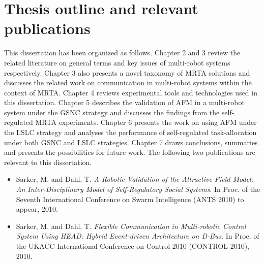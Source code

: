 \section{Thesis outline and relevant publications}
This dissertation has been organized as follows.
Chapter 2 and 3 review the related literature on general terms and key issues of multi-robot systems respectively. Chapter 3 also presents a novel taxonomy of MRTA solutions and discusses the related work on communication in multi-robot systems within the context of MRTA.
Chapter 4 reviews experimental tools and technologies used in this dissertation.
Chapter 5 describes the validation of AFM in a multi-robot system under the GSNC strategy and discusses the findings from the self-regulated MRTA experiments.
Chapter 6 presents the work on using AFM under the LSLC strategy and analyses the performance of self-regulated task-allocation under both GSNC and LSLC strategies.
Chapter 7 draws conclusions, summaries and presents the possibilities for future work.
The following two publications are relevant to this dissertation.
\begin{itemize}
\item Sarker, M. and Dahl, T.\textit{ A Robotic Validation of the Attractive Field Model: An Inter-Disciplinary Model of Self-Regulatory Social Systems}. In Proc. of the Seventh International Conference on Swarm Intelligence (ANTS 2010) to appear, 2010.
\item Sarker, M. and Dahl, T. \textit{Flexible Communication in Multi-robotic Control System Using HEAD: Hybrid Event-driven Architecture on D-Bus}. In Proc. of the UKACC International Conference on Control 2010 (CONTROL 2010), 2010.
\end{itemize}